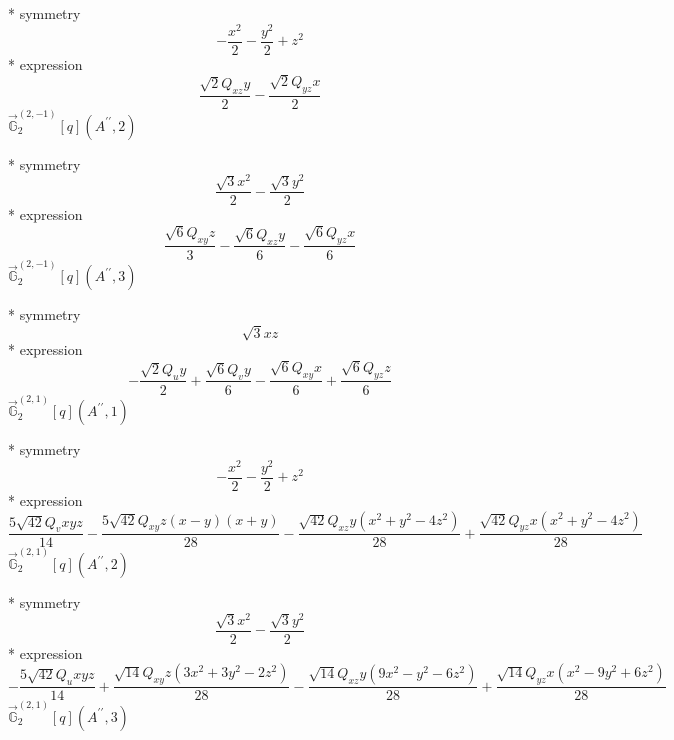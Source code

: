 \documentclass[fleqn,8pt]{jsarticle}
\begin{document}
\noindent\quad ** symmetry
\begin{dmath*}
- \frac{x^{2}}{2} - \frac{y^{2}}{2} + z^{2}
\end{dmath*}
\noindent\quad ** expression
\begin{dmath*}
\frac{\sqrt{2} Q_{xz} y}{2} - \frac{\sqrt{2} Q_{yz} x}{2}
\end{dmath*}
\noindent\quad $\vec{\mathbb{G}}_{2}^{(2,-1)}[q](A^{\prime\prime},2)$

\noindent\quad ** symmetry
\begin{dmath*}
\frac{\sqrt{3} x^{2}}{2} - \frac{\sqrt{3} y^{2}}{2}
\end{dmath*}
\noindent\quad ** expression
\begin{dmath*}
\frac{\sqrt{6} Q_{xy} z}{3} - \frac{\sqrt{6} Q_{xz} y}{6} - \frac{\sqrt{6} Q_{yz} x}{6}
\end{dmath*}
\noindent\quad $\vec{\mathbb{G}}_{2}^{(2,-1)}[q](A^{\prime\prime},3)$

\noindent\quad ** symmetry
\begin{dmath*}
\sqrt{3} x z
\end{dmath*}
\noindent\quad ** expression
\begin{dmath*}
- \frac{\sqrt{2} Q_{u} y}{2} + \frac{\sqrt{6} Q_{v} y}{6} - \frac{\sqrt{6} Q_{xy} x}{6} + \frac{\sqrt{6} Q_{yz} z}{6}
\end{dmath*}
\noindent\quad $\vec{\mathbb{G}}_{2}^{(2,1)}[q](A^{\prime\prime},1)$

\noindent\quad ** symmetry
\begin{dmath*}
- \frac{x^{2}}{2} - \frac{y^{2}}{2} + z^{2}
\end{dmath*}
\noindent\quad ** expression
\begin{dmath*}
\frac{5 \sqrt{42} Q_{v} x y z}{14} - \frac{5 \sqrt{42} Q_{xy} z \left(x - y\right) \left(x + y\right)}{28} - \frac{\sqrt{42} Q_{xz} y \left(x^{2} + y^{2} - 4 z^{2}\right)}{28} + \frac{\sqrt{42} Q_{yz} x \left(x^{2} + y^{2} - 4 z^{2}\right)}{28}
\end{dmath*}
\noindent\quad $\vec{\mathbb{G}}_{2}^{(2,1)}[q](A^{\prime\prime},2)$

\noindent\quad ** symmetry
\begin{dmath*}
\frac{\sqrt{3} x^{2}}{2} - \frac{\sqrt{3} y^{2}}{2}
\end{dmath*}
\noindent\quad ** expression
\begin{dmath*}
- \frac{5 \sqrt{42} Q_{u} x y z}{14} + \frac{\sqrt{14} Q_{xy} z \left(3 x^{2} + 3 y^{2} - 2 z^{2}\right)}{28} - \frac{\sqrt{14} Q_{xz} y \left(9 x^{2} - y^{2} - 6 z^{2}\right)}{28} + \frac{\sqrt{14} Q_{yz} x \left(x^{2} - 9 y^{2} + 6 z^{2}\right)}{28}
\end{dmath*}
\noindent\quad $\vec{\mathbb{G}}_{2}^{(2,1)}[q](A^{\prime\prime},3)$
\end{document}
